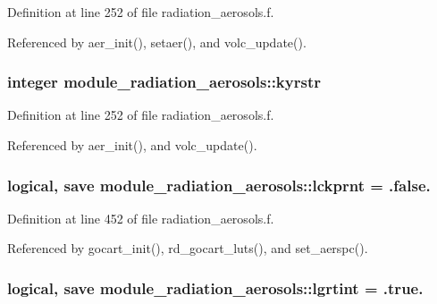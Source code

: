 Definition at line 252 of file radiation\+\_\+aerosols.\+f.



Referenced by aer\+\_\+init(), setaer(), and volc\+\_\+update().

\subsubsection[{\texorpdfstring{kyrstr}{kyrstr}}]{\setlength{\rightskip}{0pt plus 5cm}integer module\+\_\+radiation\+\_\+aerosols\+::kyrstr\hspace{0.3cm}{\ttfamily [private]}}\hypertarget{group__module__radiation__aerosols_gaf224f7d7991e3d48aeaa4d221da50f41}{}\label{group__module__radiation__aerosols_gaf224f7d7991e3d48aeaa4d221da50f41}


Definition at line 252 of file radiation\+\_\+aerosols.\+f.



Referenced by aer\+\_\+init(), and volc\+\_\+update().

\subsubsection[{\texorpdfstring{lckprnt}{lckprnt}}]{\setlength{\rightskip}{0pt plus 5cm}logical, save module\+\_\+radiation\+\_\+aerosols\+::lckprnt = .false.\hspace{0.3cm}{\ttfamily [private]}}\hypertarget{group__module__radiation__aerosols_ga018d5414597049069c1ddd1094285371}{}\label{group__module__radiation__aerosols_ga018d5414597049069c1ddd1094285371}


Definition at line 452 of file radiation\+\_\+aerosols.\+f.



Referenced by gocart\+\_\+init(), rd\+\_\+gocart\+\_\+luts(), and set\+\_\+aerspc().

\subsubsection[{\texorpdfstring{lgrtint}{lgrtint}}]{\setlength{\rightskip}{0pt plus 5cm}logical, save module\+\_\+radiation\+\_\+aerosols\+::lgrtint = .true.\hspace{0.3cm}{\ttfamily [private]}}\hypertarget{group__module__radiation__aerosols_gaa27bf6912bfd67b78381892d4f555c51}{}\label{group__module__radiation__aerosols_gaa27bf6912bfd67b78381892d4f555c51}


